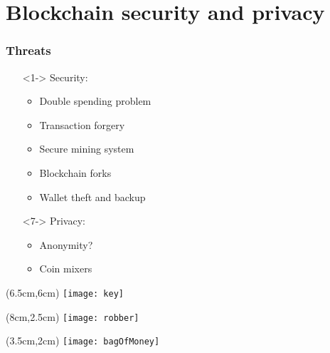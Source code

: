 \section{Blockchain security and privacy}
\begin{frame}
  \frametitle{Threats}

  \begin{itemize}
   \item[]<1-> Security:
    \begin{itemize}
      \item<2-> Double spending problem
      \item<3-> Transaction forgery
      \item<4-> Secure mining system
      \item<5-> Blockchain forks
      \item<6-> Wallet theft and backup
    \end{itemize}
   \item[]<7-> Privacy:
    \begin{itemize}
      \item<8-> Anonymity?
      \item<9-> Coin mixers
    \end{itemize}
  \end{itemize}

  \begin{textblock*}{5cm}(6.5cm,6cm)
    \texttt{[image: key]}
  \end{textblock*}

  \begin{textblock*}{5cm}(8cm,2.5cm)
    \texttt{[image: robber]}
  \end{textblock*}

  \begin{textblock*}{5cm}(3.5cm,2cm)
    \texttt{[image: bagOfMoney]}
  \end{textblock*}
\end{frame}
